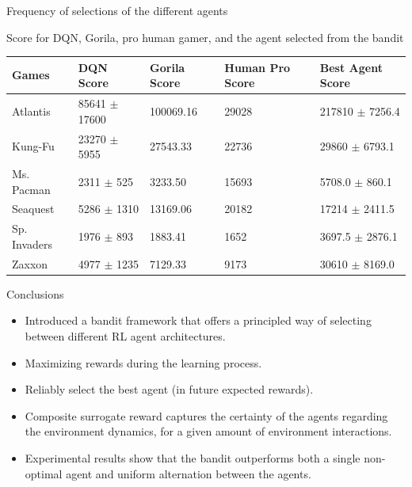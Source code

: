 \documentclass[final]{beamer}
\newlength{\onecolwid}
\begin{document}
\begin{frame}[t]
\begin{columns}[t]
\begin{column}{\onecolwid}
\begin{block}{Frequency of selections of the different agents}
\end{block}

\vspace*{-1.5cm}

\begin{block}{Score for DQN, Gorila, pro human gamer, and the agent selected from the bandit}

  \centering
  \begin{tabular}{|p{5.5cm}|p{6.5cm}|l|p{4.5cm}|p{7.5cm}|}
  \hline
  Games & DQN Score & Gorila Score & Human Pro Score & Best Agent Score\\
  \hline
    Atlantis            & 85641 $\pm$ 17600 & 100069.16 & 29028 & 217810 $\pm$ 7256.4 \\
    Kung-Fu             & 23270 $\pm$  5955 & 27543.33  & 22736 & 29860  $\pm$  6793.1 \\
    Ms. Pacman          &  2311 $\pm$   525 & 3233.50   & 15693 & 5708.0 $\pm$  860.1 \\
    Seaquest            &  5286 $\pm$  1310 & 13169.06  & 20182 & 17214  $\pm$ 2411.5 \\
    Sp. Invaders        &  1976 $\pm$   893 & 1883.41   &  1652 & 3697.5 $\pm$ 2876.1 \\
    Zaxxon              &  4977 $\pm$  1235 & 7129.33   &  9173 & 30610  $\pm$ 8169.0 \\
  \hline  
  \end{tabular}
  \label{tab:1}

\end{block}

\begin{block}{Conclusions}

\begin{itemize}
\item Introduced a bandit framework that offers a principled way of selecting between different RL agent architectures. 
\item Maximizing rewards during the learning process.
\item Reliably select the best agent (in future expected rewards). 
\item Composite surrogate reward captures the certainty of the agents regarding the environment dynamics, for a given amount of environment interactions.
\item Experimental results show that the bandit outperforms both a single non-optimal agent and uniform alternation between the agents.
\end{itemize}

\end{block}


\end{column}
\end{columns}
\end{frame}
\end{document}
